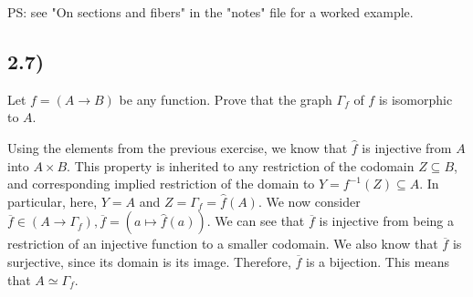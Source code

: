 \documentclass[12pt, letterpaper, twoside]{report}
\begin{document}


PS: see "On sections and fibers" in the "notes" file for a worked example.



\subsection*{2.7)}

Let $f = (A \to B)$ be any function. Prove that the graph $\Gamma_f$ of $f$ is isomorphic to $A$.

Using the elements from the previous exercise, we know that $\hat{f}$ is injective from $A$ into $A \times B$. This property is inherited to any restriction of the codomain $Z \subseteq B$, and corresponding implied restriction of the domain to $Y = f^{-1}(Z) \subseteq A$. In particular, here, $Y = A$ and $Z = \Gamma_f = \hat{f}(A)$. We now consider $\overline{f} \in (A \to \Gamma_f), \overline{f} = (a \mapsto \hat{f}(a))$. We can see that $\overline{f}$ is injective from being a restriction of an injective function to a smaller codomain. We also know that $\overline{f}$ is surjective, since its domain is its image. Therefore, $\overline{f}$ is a bijection. This means that $A \simeq \Gamma_f$.
\end{document}
